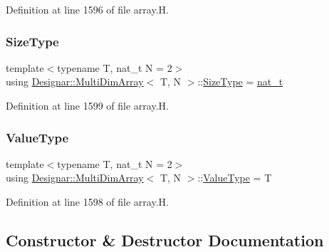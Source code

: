 Definition at line 1596 of file array.\+H.

\mbox{\label{class_designar_1_1_multi_dim_array_a45c10514739f65d38ae3749569739267}} 
\subsubsection{\texorpdfstring{Size\+Type}{SizeType}}
{\footnotesize\ttfamily template$<$typename T, nat\+\_\+t N = 2$>$ \\
using \hyperlink{class_designar_1_1_multi_dim_array}{Designar\+::\+Multi\+Dim\+Array}$<$ T, N $>$\+::\hyperlink{class_designar_1_1_multi_dim_array_a45c10514739f65d38ae3749569739267}{Size\+Type} =  \hyperlink{namespace_designar_aa72662848b9f4815e7bf31a7cf3e33d1}{nat\+\_\+t}}



Definition at line 1599 of file array.\+H.

\mbox{\label{class_designar_1_1_multi_dim_array_aecea28d754897523cdfa68bc28b829d3}} 
\subsubsection{\texorpdfstring{Value\+Type}{ValueType}}
{\footnotesize\ttfamily template$<$typename T, nat\+\_\+t N = 2$>$ \\
using \hyperlink{class_designar_1_1_multi_dim_array}{Designar\+::\+Multi\+Dim\+Array}$<$ T, N $>$\+::\hyperlink{class_designar_1_1_multi_dim_array_aecea28d754897523cdfa68bc28b829d3}{Value\+Type} =  T}



Definition at line 1598 of file array.\+H.



\subsection{Constructor \& Destructor Documentation}
\mbox{\label{class_designar_1_1_multi_dim_array_a52a96f1eeb1176cc18d6329ab75e59f8}} 
